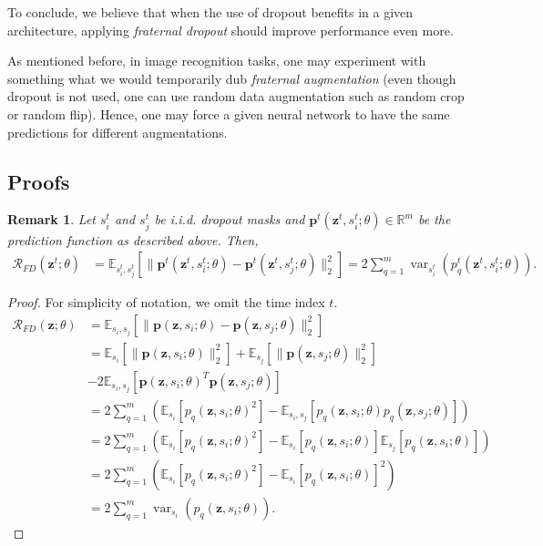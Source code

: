 \documentclass{article} \usepackage{iclr2018_conference,times}
\newtheorem{remark}{Remark}
\DeclareMathOperator{\var}{var}
\begin{document}
To conclude, we believe that when the use of dropout benefits in a given architecture, applying \emph{fraternal dropout} should improve performance even more.

As mentioned before, in image recognition tasks, one may experiment with something what we would temporarily dub \emph{fraternal augmentation} (even though dropout is not used, one can use random data augmentation such as random crop or random flip). Hence, one may force a given neural network to have the same predictions for different augmentations.

\newpage
\subsection*{Proofs}
\setcounter{remark}{0}
\setcounter{proposition}{0}

\begin{remark}
Let $s_i^t$ and $s_j^t$ be i.i.d. dropout masks and $\mathbf{p}^t(\mathbf{z}^t, s_i^t; \theta) \in \mathbb{R}^m$ be the prediction function as described above. Then, 
\begin{align}
\mathcal{R}_{FD}(\mathbf{z}^{t}; \theta) &= \mathbb{E}_{s_i^t, s_j^t} \left[ \lVert \mathbf{p}^t(\mathbf{z}^t, s_i^t; \theta) - \mathbf{p}^t(\mathbf{z}^t, s_j^t; \theta) \rVert^2_2 \right] = 2\sum_{q=1}^{m} \var_{s_i^t}( {p}_q^t(\mathbf{z}^t, s_i^t; \theta) ).
\end{align}
\end{remark}
\begin{proof}
For simplicity of notation, we omit the time index $t$.
\begin{align}
\mathcal{R}_{FD}(\mathbf{z}; \theta) &= \mathbb{E}_{s_i, s_j} \left[ \lVert \mathbf{p}(\mathbf{z}, s_i; \theta) - \mathbf{p}(\mathbf{z}, s_j; \theta) \rVert^2_2 \right] \\
&= \mathbb{E}_{s_i}\left[ \lVert \mathbf{p}(\mathbf{z}, s_i; \theta) \rVert^2_2 \right]  + \mathbb{E}_{s_j}\left[ \lVert \mathbf{p}(\mathbf{z}, s_j; \theta) \rVert^2_2 \right] \\ \nonumber
&- 2 \mathbb{E}_{s_i, s_j}\left[  \mathbf{p}(\mathbf{z}, s_i; \theta)^T \mathbf{p}(\mathbf{z}, s_j; \theta)\right] \\
&= 2\sum_{q=1}^{m} \left( \mathbb{E}_{s_i}\left[ {p}_q(\mathbf{z}, s_i; \theta)^2 \right]  - \mathbb{E}_{s_i, s_j}\left[  {p}_{q}(\mathbf{z}, s_i; \theta) {p}_{q}(\mathbf{z}, s_j; \theta)\right] \right) \\
&= 2\sum_{q=1}^{m} \left( \mathbb{E}_{s_i}\left[ {p}_q(\mathbf{z}, s_i; \theta)^2 \right]  - \mathbb{E}_{s_i}\left[ {p}_{q}(\mathbf{z}, s_i; \theta) \right] \mathbb{E}_{s_j}\left[ {p}_{q}(\mathbf{z}, s_i; \theta) \right] \right) \\
&= 2\sum_{q=1}^{m} \left( \mathbb{E}_{s_i}\left[ {p}_q(\mathbf{z}, s_i; \theta)^2 \right]  - \mathbb{E}_{s_i}\left[  {p}_{q}(\mathbf{z}, s_i; \theta) \right]^2 \right) \\
&= 2\sum_{q=1}^{m} \var_{s_i}( {p}_q(\mathbf{z}, s_i; \theta) ).
\end{align}
\end{proof}
\end{document}
